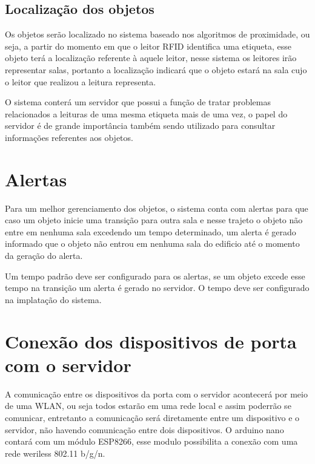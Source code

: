 \subsection{Localização dos objetos}
Os objetos serão localizado no sistema baseado nos algoritmos de proximidade, ou seja, a partir do momento em que o leitor RFID identifica uma etiqueta, esse objeto terá a localização referente à aquele leitor, nesse sistema os leitores irão representar salas, portanto a localização indicará que o objeto estará na sala cujo o leitor que realizou a leitura representa.
\par
O sistema conterá um servidor que possui a função de tratar problemas relacionados a leituras de uma mesma etiqueta mais de uma vez, o papel do servidor é de grande importância também sendo utilizado para consultar informações referentes aos objetos.

\section{Alertas}
Para um melhor gerenciamento dos objetos, o sistema conta com alertas para que caso um objeto inicie uma transição para outra sala e nesse trajeto o objeto não entre em nenhuma sala excedendo um tempo determinado, um alerta é gerado informado que o objeto não entrou em nenhuma sala do edificio até o momento da geração do alerta.
\par
Um tempo padrão deve ser configurado para os alertas, se um objeto excede esse tempo na transição um alerta é gerado no servidor. O tempo deve ser configurado na implatação do sistema.

\section{Conexão dos dispositivos de porta com o servidor}
A comunicação entre os dispositivos da porta com o servidor acontecerá por meio de uma WLAN, ou seja todos estarão em uma rede local e assim poderrão se comunicar, entretanto a comunicação será diretamente entre um dispositivo e o servidor, não havendo comunicação entre dois dispositivos. O arduino nano contará com um módulo ESP8266, esse modulo possibilita a conexão com uma rede weriless 802.11 b/g/n.

